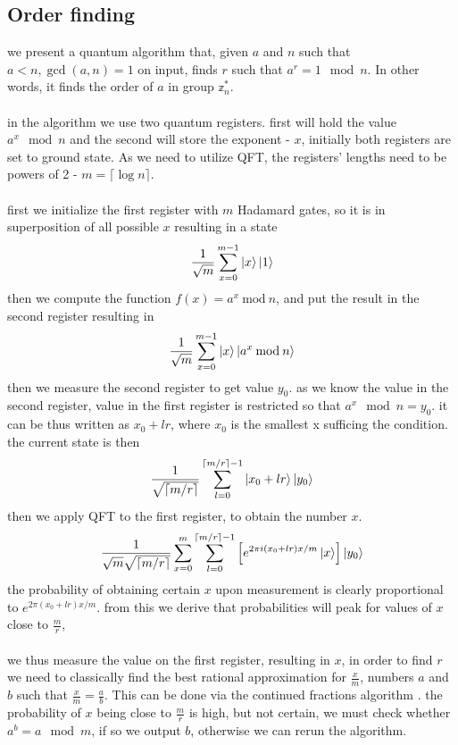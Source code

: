 \subsection{Order finding}
we present a quantum algorithm that, given $a$ and $n$ such that $a<n, \gcd(a,n)=1$ on input, finds $r$ such that $a ^r=1 \mod n$. In other words, it finds the order of $a$ in group $\mathbb{z}_n^*$.\\\\
in the algorithm we use two quantum registers. first will hold the value $a^x \mod n$ and the second will store the exponent - $x$, initially both registers are set to ground state. As we need to utilize QFT, the registers' lengths need to be powers of 2 - $m=\lceil\log n\rceil$.\\\\
first we initialize the first register with $m$ Hadamard gates, so it is in superposition of all possible $x$ resulting in a state
\begin{align*}
    \frac{1}{\sqrt{m}}\sum_{x=0}^{m-1}\ket{x}\ket{1}
\end{align*}
then we compute the function $f(x)=a^x \: \text{mod}\: n$, and put the result in the second register resulting in
\begin{align*}
    \frac{1}{\sqrt{m}}\sum_{x=0}^{m-1}\ket{x}\ket{a^x\: \text{mod}\: n}
\end{align*}
then we measure the second register to get value $y_0$. as we know the value in the second register, value in the first register is restricted so that $a^x \mod{n}=y_0$. it can be thus written as $x_0+lr$, where $x_0$ is the smallest x sufficing the condition. the current state is then  
\begin{align*}
  \frac{1}{\sqrt{\lceil m/r \rceil}}\sum_{l=0}^{\lceil m/r \rceil-1}\ket{x_0 + lr}\ket{y_0}
\end{align*}
then we apply QFT to the first register, to obtain the number $x$. 
\begin{align*}
  \frac{1}{\sqrt{m}\sqrt{\lceil m/r \rceil}}\sum_{x=0}^m\sum_{l=0}^{\lceil m/r \rceil-1}\left[e^{2\pi i (x_0+lr)x/m}\ket{x}\right]\ket{y_0}
\end{align*}  
the probability of obtaining certain $x$ upon measurement is clearly proportional to $e^{2\pi (x_0+lr)x/m}$. from this we derive that probabilities will peak for values of $x$ close to $\frac{m}{r}$, \\\\
we thus measure the value on the first register, resulting in $x$, in order to find $r$ we need to classically find the best rational approximation for $\frac{x}{m}$, numbers $a$ and $b$ such that $\frac{x}{m}=\frac{a}{b}$. This can be done via the continued fractions algorithm \cite{continued_fractions}. the probability of $x$ being close to $\frac{m}{r}$ is high, but not certain, we must check whether $a^b=a \mod{m}$, if so we output $b$, otherwise we can rerun the algorithm. 


